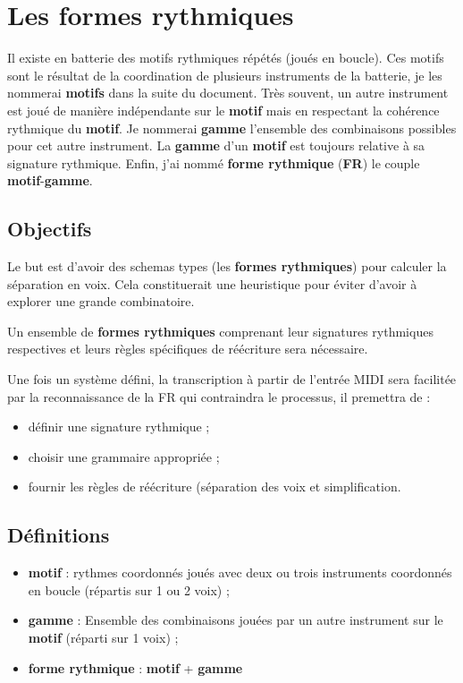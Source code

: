 \section{Les formes rythmiques}
\label{systemes_methodes}
Il existe en batterie des motifs rythmiques répétés (joués en boucle). Ces
motifs sont le résultat de la coordination de plusieurs instruments de la
batterie, je les nommerai \textbf{motifs} dans la suite du document. Très
souvent, un autre instrument est joué de manière indépendante sur le
\textbf{motif} mais en respectant la cohérence rythmique du \textbf{motif}. Je
nommerai \textbf{gamme} l’ensemble des combinaisons possibles pour cet autre
instrument. La \textbf{gamme} d’un \textbf{motif} est toujours relative à sa
signature rythmique. Enfin, j’ai nommé \textbf{forme rythmique} (\textbf{FR})
le couple \textbf{motif}-\textbf{gamme}.

\subsection*{Objectifs}
Le but est d'avoir des schemas types (les \textbf{formes rythmiques}) pour
calculer la séparation en voix. Cela constituerait une heuristique pour éviter
d'avoir à explorer une grande combinatoire.

Un ensemble de \textbf{formes rythmiques} comprenant leur signatures rythmiques
respectives et leurs règles spécifiques de réécriture sera nécessaire.

Une fois un système défini, la transcription à partir de l'entrée MIDI sera
facilitée par la reconnaissance de la FR qui contraindra le processus, il
premettra de :
\begin{itemize}
	\item définir une signature rythmique ;
	\item choisir une grammaire appropriée ;
	\item fournir les règles de réécriture (séparation des voix et
        simplification.
\end{itemize}

\subsection*{Définitions}

\begin{itemize}
    \item \textbf{motif} : rythmes coordonnés joués avec deux ou trois
        instruments coordonnés en boucle (répartis sur 1 ou 2 voix) ;
    \item \textbf{gamme} : Ensemble des combinaisons jouées par un autre
        instrument sur le \textbf{motif} (réparti sur 1 voix) ;
    \item \textbf{forme rythmique} : \textbf{motif} + \textbf{gamme}\\
\end{itemize}

